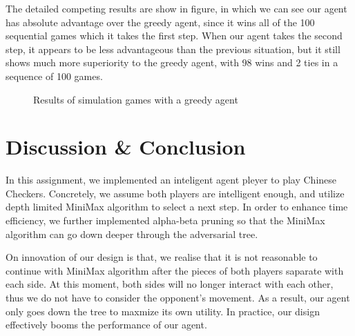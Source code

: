 \documentclass[aps,letterpaper,10pt]{article}
\begin{document}
The detailed competing results are show in figure, in which we can see our agent has absolute advantage over the greedy agent, since it wins all of the 100 sequential games which it takes the first step. When our agent takes the second step, it appears to be less advantageous than the previous situation, but it still shows much more superiority to the greedy agent, with 98 wins and 2 ties in a sequence of 100 games.

\begin{figure}[!h] \centering    
	\caption{ Results of simulation games with a greedy agent }     
	\label{games}     
\end{figure} 
\newpage
\section{Discussion \& Conclusion}
In this assignment, we implemented an inteligent agent pleyer to play Chinese Checkers. Concretely, we assume both players are intelligent enough, and utilize depth limited MiniMax algorithm to select a next step. In order to enhance time efficiency, we further implemented alpha-beta pruning so that the MiniMax algorithm can go down deeper through the adversarial tree. 

On innovation of our design is that, we realise that it is not reasonable to continue with MiniMax algorithm after the pieces of both players saparate with each side. At this moment, both sides will no longer interact with each other, thus we do not have to consider the opponent's movement. As a result, our agent only goes down the tree to maxmize its own utility. In practice, our disign effectively booms the performance of our agent.
\end{document}
